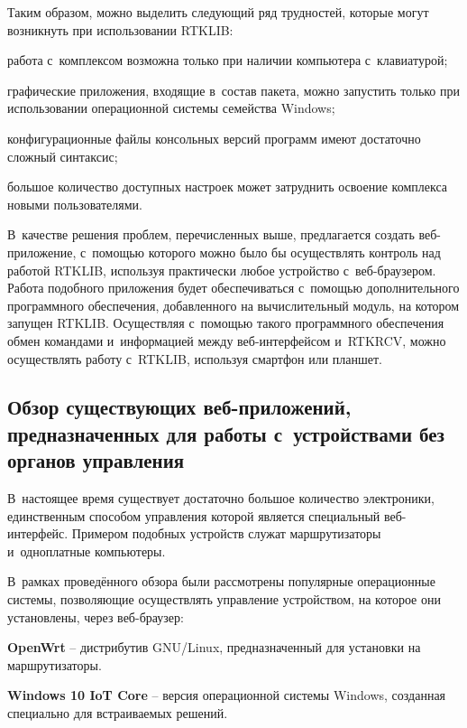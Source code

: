 Таким образом, можно выделить следующий ряд трудностей, которые могут возникнуть при использовании RTKLIB:

\begin{dashitemize}
  \item работа с~комплексом возможна только при наличии компьютера с~клавиатурой;
  \item графические приложения, входящие в~состав пакета, можно запустить только при использовании операционной системы семейства Windows;
  \item конфигурационные файлы консольных версий программ имеют достаточно сложный синтаксис;
  \item большое количество доступных настроек может затруднить освоение комплекса новыми пользователями.
\end{dashitemize}

В~качестве решения проблем, перечисленных выше, предлагается создать веб-приложение, с~помощью которого можно было бы осуществлять контроль над работой RTKLIB, используя практически любое устройство с~веб-браузером. Работа подобного приложения будет обеспечиваться с~помощью дополнительного программного обеспечения, добавленного на вычислительный модуль, на котором запущен RTKLIB. Осуществляя с~помощью такого программного обеспечения обмен командами и~информацией между веб-интерфейсом и~RTKRCV, можно осуществлять работу с~RTKLIB, используя смартфон или планшет.

\subsection{Обзор существующих веб-приложений, предназначенных для работы с~устройствами без органов управления}
\label{subsec:web-apps-review}

В~настоящее время существует достаточно большое количество электроники, единственным способом управления которой является специальный веб-интерфейс. Примером подобных устройств служат маршрутизаторы и~одноплатные компьютеры. \par

В~рамках проведённого обзора были рассмотрены популярные операционные системы, позволяющие осуществлять управление устройством, на которое они установлены, через веб-браузер:

\begin{dashitemize}
  \item \textbf{OpenWrt} -- дистрибутив GNU/Linux, предназначенный для установки на маршрутизаторы.
  \item \textbf{Windows 10 IoT Core} -- версия операционной системы Windows, созданная специально для встраиваемых решений.
\end{dashitemize}

